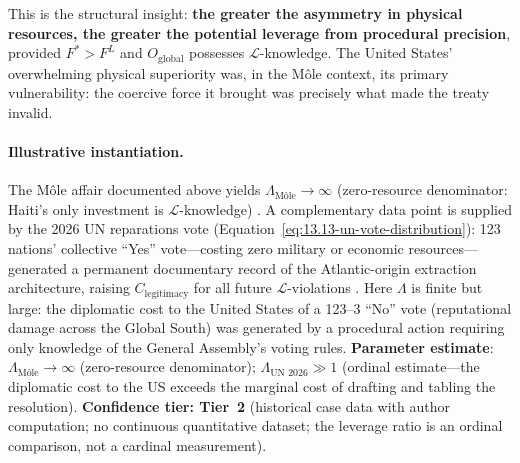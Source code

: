 This is the structural insight: \textbf{the greater the asymmetry in physical resources, the greater the potential leverage from procedural precision}, provided $F^* > F^L$ and $O_{\text{global}}$ possesses $\mathcal{L}$-knowledge. The United States' overwhelming physical superiority was, in the Môle context, its primary vulnerability: the coercive force it brought was precisely what made the treaty invalid.

\paragraph{Illustrative instantiation.}
The Môle affair documented above yields $\Lambda_{\text{M\^{o}le}} \to \infty$ (zero-resource denominator: Haiti's only investment is $\mathcal{L}$-knowledge) \cite{firmin_legacy, manigat}. A complementary data point is supplied by the 2026 UN reparations vote (Equation~\ref{eq:13.13-un-vote-distribution}): 123 nations' collective ``Yes'' vote---costing zero military or economic resources---generated a permanent documentary record of the Atlantic-origin extraction architecture, raising $C_{\text{legitimacy}}$ for all future $\mathcal{L}$-violations \cite{unreparations2026}. Here $\Lambda$ is finite but large: the diplomatic cost to the United States of a 123--3 ``No'' vote (reputational damage across the Global South) was generated by a procedural action requiring only knowledge of the General Assembly's voting rules. \textbf{Parameter estimate}: $\Lambda_{\text{M\^{o}le}} \to \infty$ (zero-resource denominator); $\Lambda_{\text{UN~2026}} \gg 1$ (ordinal estimate---the diplomatic cost to the US exceeds the marginal cost of drafting and tabling the resolution). \textbf{Confidence tier: Tier~2} (historical case data with author computation; no continuous quantitative dataset; the leverage ratio is an ordinal comparison, not a cardinal measurement).

